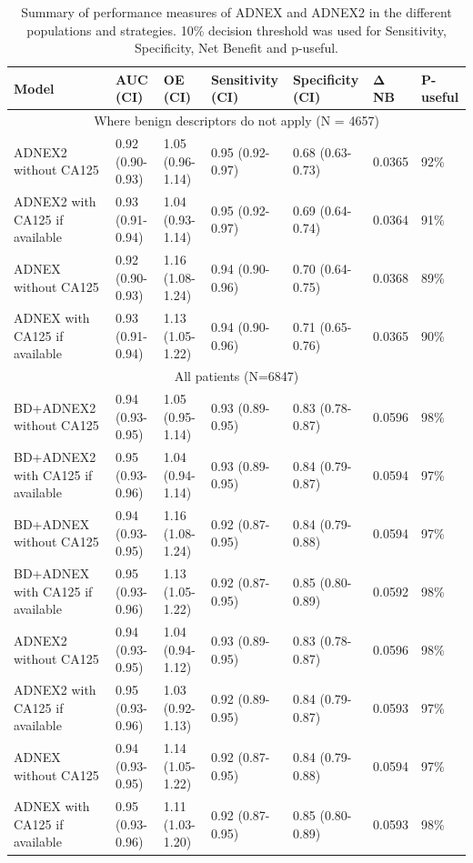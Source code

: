 \begin{table}
\centering
\scriptsize
\caption[Performance measures of ADNEX and ADNEX2]{Summary of performance measures of ADNEX and ADNEX2 in the different populations and strategies. 10\% decision threshold was used for Sensitivity, Specificity, Net Benefit and p-useful.}
\label{tab:ADNEX2:2}
 \begin{tabularx}{\textwidth}{p{2.80cm}XXXXp{0.75cm}p{1.05cm}}
    \toprule
       \textbf{Model} & \textbf{AUC (CI)} &  \textbf{OE (CI)} & \textbf{Sensitivity (CI)} & \textbf{Specificity (CI)} & \textbf{Δ NB} & \textbf{P-useful} \\ 
        \midrule
        \multicolumn{7}{c}{Where benign descriptors do not apply (N = 4657)}  \\ 
        \midrule

        ADNEX2 without CA125 & 0.92 (0.90-0.93)  & 1.05 (0.96-1.14) & 0.95 (0.92-0.97) & 0.68 (0.63-0.73) & 0.0365 & 92\% \\ 
        ADNEX2 with CA125 if available & 0.93 (0.91-0.94)  & 1.04 (0.93-1.14) & 0.95 (0.92-0.97) & 0.69 (0.64-0.74) & 0.0364 & 91\% \\ 
        ADNEX without CA125 & 0.92 (0.90-0.93) & 1.16 (1.08-1.24) & 0.94 (0.90-0.96) & 0.70 (0.64-0.75) & 0.0368 & 89\% \\ 
        ADNEX with CA125 if available & 0.93 (0.91-0.94)  & 1.13 (1.05-1.22) & 0.94 (0.90-0.96) & 0.71 (0.65-0.76) & 0.0365 & 90\% \\ 
        \midrule
        \multicolumn{7}{c}{All patients (N=6847)} \\ 
        \midrule

        BD+ADNEX2 without CA125 & 0.94 (0.93-0.95) & 1.05 (0.95-1.14) & 0.93 (0.89-0.95) & 0.83 (0.78-0.87) & 0.0596 & 98\% \\ 
        BD+ADNEX2 with CA125 if available & 0.95 (0.93-0.96)  & 1.04 (0.94-1.14) & 0.93 (0.89-0.95) & 0.84 (0.79-0.87) & 0.0594 & 97\% \\ 
        BD+ADNEX without CA125 & 0.94 (0.93-0.95)  & 1.16 (1.08-1.24) & 0.92 (0.87-0.95) & 0.84 (0.79-0.88) & 0.0594 & 97\% \\ 
        BD+ADNEX with CA125 if available & 0.95 (0.93-0.96) & 1.13 (1.05-1.22) & 0.92 (0.87-0.95) & 0.85 (0.80-0.89) & 0.0592 & 98\% \\ 
        ADNEX2 without CA125 & 0.94 (0.93-0.95)  & 1.04 (0.94-1.12) & 0.93 (0.89-0.95) & 0.83 (0.78-0.87) & 0.0596 & 98\% \\ 
        ADNEX2 with CA125 if available & 0.95 (0.93-0.96)  & 1.03 (0.92-1.13) & 0.92 (0.89-0.95) & 0.84 (0.79-0.87) & 0.0593 & 97\% \\ 
        ADNEX without CA125 & 0.94 (0.93-0.95)  & 1.14 (1.05-1.22) & 0.92 (0.87-0.95) & 0.84 (0.79-0.88) & 0.0594 & 97\% \\ 
        ADNEX with CA125 if available & 0.95 (0.93-0.96) & 1.11 (1.03-1.20) & 0.92 (0.87-0.95) & 0.85 (0.80-0.89) & 0.0593 & 98\% \\ 
        \bottomrule
    \end{tabularx}
    \noindent\begin{minipage}{\textwidth}
\raggedright\footnotesize
\addlinespace[0.5em]


\end{minipage}
\end{table}
